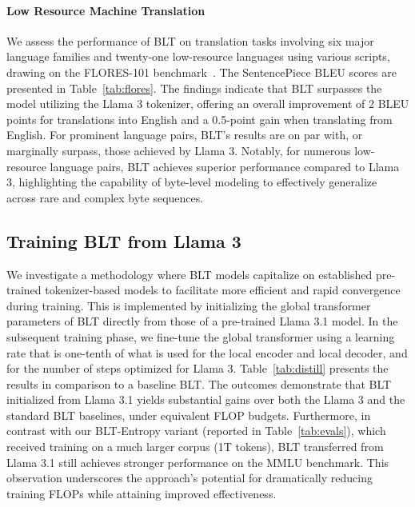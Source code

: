 \paragraph{Low Resource Machine Translation} We assess the performance of {\textsc BLT} on translation tasks involving six major language families and twenty-one low-resource languages using various scripts, drawing on the FLORES-101 benchmark~\citep{goyal2022flores}. The SentencePiece BLEU scores are presented in Table~\ref{tab:flores}. The findings indicate that {\textsc BLT} surpasses the model utilizing the Llama 3 tokenizer, offering an overall improvement of 2 BLEU points for translations into English and a 0.5-point gain when translating from English. For prominent language pairs, {\textsc BLT}'s results are on par with, or marginally surpass, those achieved by Llama 3. Notably, for numerous low-resource language pairs, {\textsc BLT} achieves superior performance compared to Llama 3, highlighting the capability of byte-level modeling to effectively generalize across rare and complex byte sequences.

\subsection{Training {\textsc BLT} from Llama 3}
\label{sec:distillation}
We investigate a methodology where {\textsc BLT} models capitalize on established pre-trained tokenizer-based models to facilitate more efficient and rapid convergence during training. This is implemented by initializing the global transformer parameters of {\textsc BLT} directly from those of a pre-trained Llama 3.1 model. In the subsequent training phase, we fine-tune the global transformer using a learning rate that is one-tenth of what is used for the local encoder and local decoder, and for the number of steps optimized for Llama 3. Table~\ref{tab:distill} presents the results in comparison to a baseline {\textsc BLT}. The outcomes demonstrate that {\textsc BLT} initialized from Llama 3.1 yields substantial gains over both the Llama 3 and the standard {\textsc BLT} baselines, under equivalent FLOP budgets. Furthermore, in contrast with our {\textsc BLT}-Entropy variant (reported in Table~\ref{tab:evals}), which received training on a much larger corpus (1T tokens), {\textsc BLT} transferred from Llama 3.1 still achieves stronger performance on the MMLU benchmark. This observation underscores the approach’s potential for dramatically reducing training FLOPs while attaining improved effectiveness.

